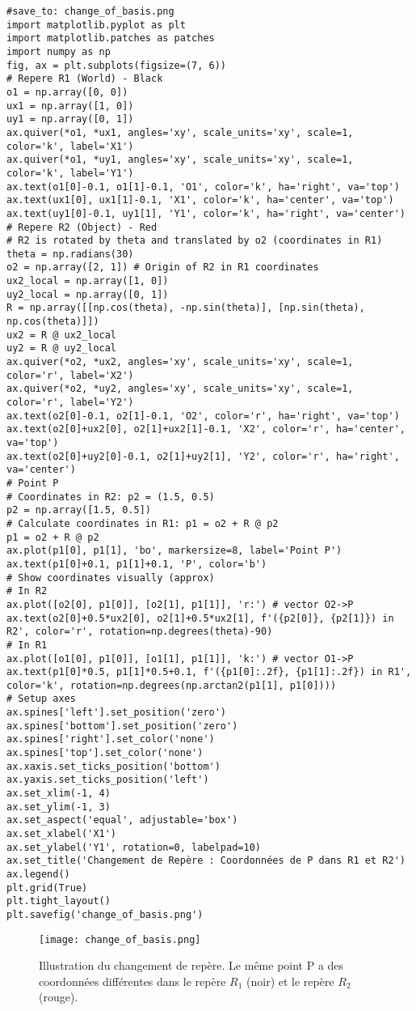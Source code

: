 \begin{verbatim}
#save_to: change_of_basis.png
import matplotlib.pyplot as plt
import matplotlib.patches as patches
import numpy as np
fig, ax = plt.subplots(figsize=(7, 6))
# Repere R1 (World) - Black
o1 = np.array([0, 0])
ux1 = np.array([1, 0])
uy1 = np.array([0, 1])
ax.quiver(*o1, *ux1, angles='xy', scale_units='xy', scale=1, color='k', label='X1')
ax.quiver(*o1, *uy1, angles='xy', scale_units='xy', scale=1, color='k', label='Y1')
ax.text(o1[0]-0.1, o1[1]-0.1, 'O1', color='k', ha='right', va='top')
ax.text(ux1[0], ux1[1]-0.1, 'X1', color='k', ha='center', va='top')
ax.text(uy1[0]-0.1, uy1[1], 'Y1', color='k', ha='right', va='center')
# Repere R2 (Object) - Red
# R2 is rotated by theta and translated by o2 (coordinates in R1)
theta = np.radians(30)
o2 = np.array([2, 1]) # Origin of R2 in R1 coordinates
ux2_local = np.array([1, 0])
uy2_local = np.array([0, 1])
R = np.array([[np.cos(theta), -np.sin(theta)], [np.sin(theta), np.cos(theta)]])
ux2 = R @ ux2_local
uy2 = R @ uy2_local
ax.quiver(*o2, *ux2, angles='xy', scale_units='xy', scale=1, color='r', label='X2')
ax.quiver(*o2, *uy2, angles='xy', scale_units='xy', scale=1, color='r', label='Y2')
ax.text(o2[0]-0.1, o2[1]-0.1, 'O2', color='r', ha='right', va='top')
ax.text(o2[0]+ux2[0], o2[1]+ux2[1]-0.1, 'X2', color='r', ha='center', va='top')
ax.text(o2[0]+uy2[0]-0.1, o2[1]+uy2[1], 'Y2', color='r', ha='right', va='center')
# Point P
# Coordinates in R2: p2 = (1.5, 0.5)
p2 = np.array([1.5, 0.5])
# Calculate coordinates in R1: p1 = o2 + R @ p2
p1 = o2 + R @ p2
ax.plot(p1[0], p1[1], 'bo', markersize=8, label='Point P')
ax.text(p1[0]+0.1, p1[1]+0.1, 'P', color='b')
# Show coordinates visually (approx)
# In R2
ax.plot([o2[0], p1[0]], [o2[1], p1[1]], 'r:') # vector O2->P
ax.text(o2[0]+0.5*ux2[0], o2[1]+0.5*ux2[1], f'({p2[0]}, {p2[1]}) in R2', color='r', rotation=np.degrees(theta)-90)
# In R1
ax.plot([o1[0], p1[0]], [o1[1], p1[1]], 'k:') # vector O1->P
ax.text(p1[0]*0.5, p1[1]*0.5+0.1, f'({p1[0]:.2f}, {p1[1]:.2f}) in R1', color='k', rotation=np.degrees(np.arctan2(p1[1], p1[0])))
# Setup axes
ax.spines['left'].set_position('zero')
ax.spines['bottom'].set_position('zero')
ax.spines['right'].set_color('none')
ax.spines['top'].set_color('none')
ax.xaxis.set_ticks_position('bottom')
ax.yaxis.set_ticks_position('left')
ax.set_xlim(-1, 4)
ax.set_ylim(-1, 3)
ax.set_aspect('equal', adjustable='box')
ax.set_xlabel('X1')
ax.set_ylabel('Y1', rotation=0, labelpad=10)
ax.set_title('Changement de Repère : Coordonnées de P dans R1 et R2')
ax.legend()
plt.grid(True)
plt.tight_layout()
plt.savefig('change_of_basis.png')
\end{verbatim}
\begin{figure}[H]
\centering
\texttt{[image: change\_of\_basis.png]}
\caption{Illustration du changement de repère. Le même point P a des coordonnées différentes dans le repère \( R_1 \) (noir) et le repère \( R_2 \) (rouge).}
\label{fig:change_of_basis}
\end{figure}

